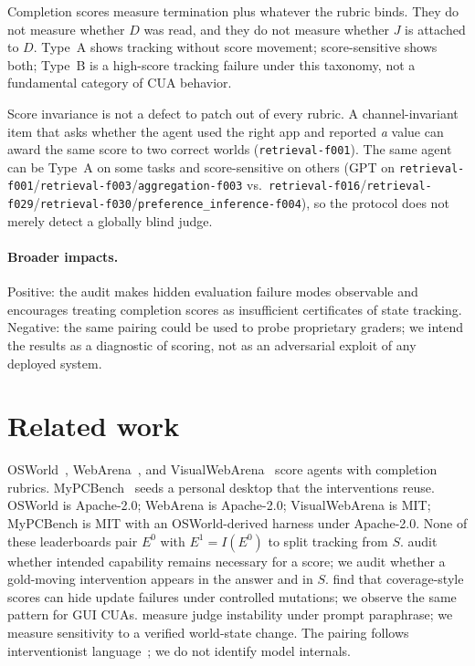 \documentclass{article}
\newcommand{\task}[1]{\texttt{#1}}
\begin{document}
Completion scores measure termination plus whatever the rubric binds.
They do not measure whether $D$ was read, and they do not measure whether $J$ is attached to $D$.
Type~A shows tracking without score movement; score-sensitive shows both; Type~B is a high-score tracking failure under this taxonomy, not a fundamental category of CUA behavior.

Score invariance is not a defect to patch out of every rubric.
A channel-invariant item that asks whether the agent used the right app and reported \emph{a} value can award the same score to two correct worlds (\task{retrieval-f001}).
The same agent can be Type~A on some tasks and score-sensitive on others (GPT on \task{retrieval-f001}/\task{retrieval-f003}/\task{aggregation-f003} vs.\ \task{retrieval-f016}/\task{retrieval-f029}/\task{retrieval-f030}/\task{preference\_inference-f004}), so the protocol does not merely detect a globally blind judge.

\paragraph{Broader impacts.}
Positive: the audit makes hidden evaluation failure modes observable and encourages treating completion scores as insufficient certificates of state tracking.
Negative: the same pairing could be used to probe proprietary graders; we intend the results as a diagnostic of scoring, not as an adversarial exploit of any deployed system.

\section{Related work}

OSWorld~\citep{xie2024osworld}, WebArena~\citep{zhou2024webarena}, and VisualWebArena~\citep{koh2024visualwebarena} score agents with completion rubrics.
MyPCBench~\citep{jang2026mypcbench} seeds a personal desktop that the interventions reuse.
OSWorld is Apache-2.0; WebArena is Apache-2.0; VisualWebArena is MIT; MyPCBench is MIT with an OSWorld-derived harness under Apache-2.0.
None of these leaderboards pair $E^0$ with $E^1=I(E^0)$ to split tracking from $S$.
\citet{shao2026protocolvalidity} audit whether intended capability remains necessary for a score; we audit whether a gold-moving intervention appears in the answer and in $S$.
\citet{turk2026counterfactualclinical} find that coverage-style scores can hide update failures under controlled mutations; we observe the same pattern for GUI CUAs.
\citet{bellibatlu2026judgesense} measure judge instability under prompt paraphrase; we measure sensitivity to a verified world-state change.
The pairing follows interventionist language~\citep{pearl2009causality}; we do not identify model internals.
\end{document}
